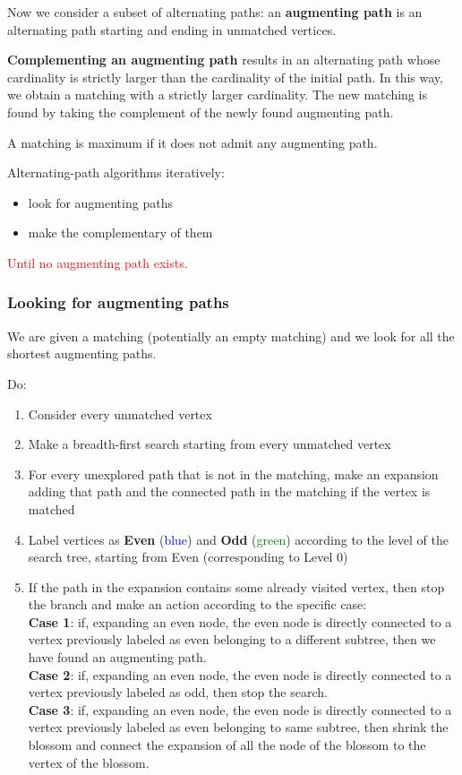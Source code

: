 \documentclass[10pt,a4paper]{article}
\begin{document}
Now we consider a subset of alternating paths: an \textbf{augmenting path} is an alternating path starting and ending in unmatched vertices.

\textbf{Complementing an augmenting path} results in an alternating path whose cardinality is strictly larger than the cardinality of the initial path. In this way, we obtain a matching with a strictly larger cardinality. The new matching is found by taking the complement of the newly found augmenting path.

A matching is maximum if it does not admit any augmenting path.
\newline

Alternating-path algorithms iteratively:

\begin{itemize}
\item look for augmenting paths
\item make the complementary of them
\end{itemize}

\textcolor{red}{Until no augmenting path exists.}

\subsubsection{Looking for augmenting paths}\label{looking-for-augmenting-paths}

We are given a matching (potentially an empty matching) and we look for all the shortest augmenting paths.

Do:\\
\begin{enumerate}
\item Consider every unmatched vertex
\item Make a breadth-first search starting from every unmatched vertex
\item For every unexplored path that is not in the matching, make an expansion adding that path and the connected path in the matching if the vertex is matched
\item Label vertices as \textbf{Even} (\textcolor{blue}{blue}) and \textbf{Odd} (\textcolor{green}{green}) according to the level of the search tree, starting from Even (corresponding to Level 0)
\item If the path in the expansion contains some already visited vertex, then stop the branch and make an action according to the specific case:\\
\textbf{Case 1}: if, expanding an even node, the even node is directly connected to a vertex previously labeled as even belonging to a different subtree, then we have found an augmenting path.\\
\textbf{Case 2}: if, expanding an even node, the even node is directly connected to a vertex previously labeled as odd, then stop the search.\\
\textbf{Case 3}: if, expanding an even node, the even node is directly connected to a vertex previously labeled as even belonging to same subtree, then shrink the blossom and connect the expansion of all the node of the blossom to the vertex of the blossom.
\end{enumerate}
\end{document}

